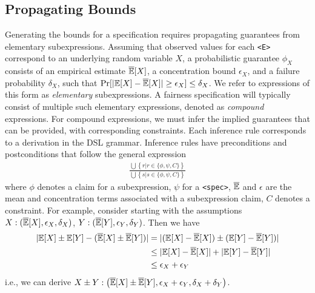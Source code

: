 \subsection{Propagating Bounds}
\label{sec:theoretical:propagation}
Generating the bounds for a specification requires propagating guarantees from elementary subexpressions.
Assuming that observed values for each \texttt{<E>} correspond to an underlying random variable $X$,
a probabilistic guarantee $\phi_X$ consists of an empirical estimate $\overline{\mathbb{E}}[X]$, a concentration bound $\epsilon_X$, and a failure probability $\delta_X$, such that $\Pr[|\mathbb{E}[X] - \overline{\mathbb{E}}[X]|\geq \epsilon_X] \leq \delta_X$.
We refer to expressions of this form as \textit{elementary} subexpressions.
A fairness specification will typically consist of multiple such elementary expressions, denoted as {\it compound} expressions.
For compound expressions, we must infer the implied guarantees that can be provided, with corresponding constraints.
Each inference rule corresponds to a derivation in the DSL grammar.
Inference rules have preconditions and postconditions that follow the general expression
\begin{align*}
 \frac{\bigcup \left\{r | r \in \{\phi, \psi, C \}\right\}}{\bigcup \left\{s | s \in \{ \phi, \psi, C \} \right\} }
\end{align*}
where $\phi$ denotes a claim for a subexpression, $\psi$ for a \verb|<spec>|, $\overline{\mathbb{E}}$ and $\epsilon$ are the mean and concentration terms associated with a subexpression claim,  $C$ denotes a constraint. 
For example, consider starting with the assumptions $X: (\overline{\mathbb{E}}[X], \epsilon_X, \delta_X)$, $Y: (\overline{\mathbb{E}}[Y], \epsilon_Y, \delta_Y)$.
Then we have
\begin{align*}
    |\mathbb{E}[X] \pm  \mathbb{E}[Y] - (\overline{\mathbb{E}}[X] \pm \overline{\mathbb{E}}[Y])| &= |(\mathbb{E}[X] - \overline{\mathbb{E}}[X]) \pm  (\mathbb{E}[Y] - \overline{\mathbb{E}}[Y])| \\
                                                  & \leq |\mathbb{E}[X] - \overline{\mathbb{E}}[X]| + |\mathbb{E}[Y] - \overline{\mathbb{E}}[Y]|\\
                                                  & \leq \epsilon_X + \epsilon_Y
\end{align*}
i.e., we can derive $X \pm Y: \left(\overline{\mathbb{E}}[X] \pm \overline{\mathbb{E}}[Y], \epsilon_X + \epsilon_Y, \delta_X + \delta_Y\right)$.
